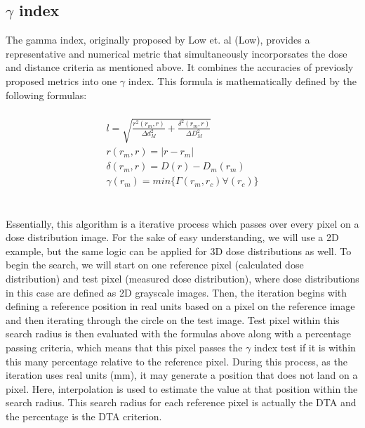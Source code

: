 \documentclass[12pt]{article}
\begin{document}
\subsection{$\gamma$ index}
The gamma index, originally proposed by Low et. al (Low), provides a representative and numerical metric that simultaneously incorporsates the dose and distance criteria as mentioned above. It combines the accuracies of previosly proposed metrics into one $\gamma$ index. This formula is mathematically defined by the following formulas:
\\
\\
\begin{align}
  l = \sqrt{\frac{r^{2}(r_{m}, r)}{\Delta d^{2}_{M}} + \frac{\delta^{2}(r_{m}, r)}{\Delta D^{2}_{M}}} \\
  r(r_{m}, r) = \lvert r-r_{m} \lvert \\
  \delta(r_{m}, r) = D(r)-D_{m}(r_{m}) \\
  \gamma(r_{m}) = min\{\Gamma(r_{m}, r_{c})\forall(r_{c})\}
\end{align}
\\
\\
Essentially, this algorithm is a iterative process which passes over every pixel on a dose distribution image. For the sake of easy understanding, we will use a 2D example, but the same logic can be applied for 3D dose distributions as well. To begin the search, we will start on one reference pixel (calculated dose distribution) and test pixel (measured dose distribution), where dose distributions in this case are defined as 2D grayscale images. Then, the iteration begins with defining a reference position in real units based on a pixel on the reference image and then iterating through the circle on the test image. Test pixel within this search radius is then evaluated with the formulas above along with a percentage passing criteria, which means that this pixel passes the $\gamma$ index test if it is within this many percentage relative to the reference pixel. During this process, as the iteration uses real units (mm), it may generate a position that does not land on a pixel. Here, interpolation is used to estimate the value at that position within the search radius. This search radius for each reference pixel is actually the DTA and the percentage is the DTA criterion.
\end{document}
